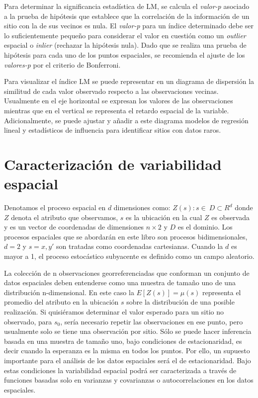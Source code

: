 \documentclass[11pt,b5paper,]{krantz}
\begin{document}
Para determinar la significancia estadística de LM, se calcula el \emph{valor-p} asociado a la prueba de hipótesis que establece que la correlación de la información de un sitio con la de sus vecinos es nula. El \emph{valor-p} para un índice determinado debe ser lo suficientemente pequeño para considerar el valor en cuestión como un \emph{outlier} espacial o \emph{inlier} (rechazar la hipótesis nula). Dado que se realiza una prueba de hipótesis para cada uno de los puntos espaciales, se recomienda el ajuste de los \emph{valores-p} por el criterio de Bonferroni.

Para visualizar el índice LM se puede representar en un diagrama de dispersión la similitud de cada valor observado respecto a las observaciones vecinas. Usualmente en el eje horizontal se expresan los valores de las observaciones mientras que en el vertical se representa el retardo espacial de la variable. Adicionalmente, se puede ajustar y añadir a este diagrama modelos de regresión lineal y estadísticos de influencia para identificar sitios con datos raros.

\hypertarget{caracterizaciuxf3n-de-variabilidad-espacial}{%
\chapter{Caracterización de variabilidad espacial}\label{caracterizaciuxf3n-de-variabilidad-espacial}}

Denotamos el proceso espacial en \(d\) dimensiones como: \({Z(s): s\in\ D\subset R^d}\) donde \(Z\) denota el atributo que observamos, \(s\) es la ubicación en la cual \(Z\) es observada y es un vector de coordenadas de dimensiones \(n\times2\) y \(D\) es el dominio. Los procesos espaciales que se abordarán en este libro son procesos bidimensionales, \(d=2\) y \(s=x,y \prime\) son tratadas como coordenadas cartesianas. Cuando la \(d\) es mayor a 1, el proceso estocástico subyacente es definido como un campo aleatorio.

La colección de n observaciones georreferenciadas que conforman un conjunto de datos espaciales deben entenderse como una muestra de tamaño uno de una distribución n-dimensional. En este caso la \(E\left[Z(s)\right]=\mu(s)\) representa el promedio del atributo en la ubicación \(s\) sobre la distribución de una posible realización. Si quisiéramos determinar el valor esperado para un sitio no observado, para \(s_0\), sería necesario repetir las observaciones en ese punto, pero usualmente solo se tiene una observación por sitio. Sólo se puede hacer inferencia basada en una muestra de tamaño uno, bajo condiciones de estacionaridad, es decir cuando la esperanza es la misma en todos los puntos. Por ello, un supuesto importante para el análisis de los datos espaciales será el de estacionaridad. Bajo estas condiciones la variabilidad espacial podrá ser caracterizada a través de funciones basadas solo en varianzas y covarianzas o autocorrelaciones en los datos espaciales.
\end{document}
